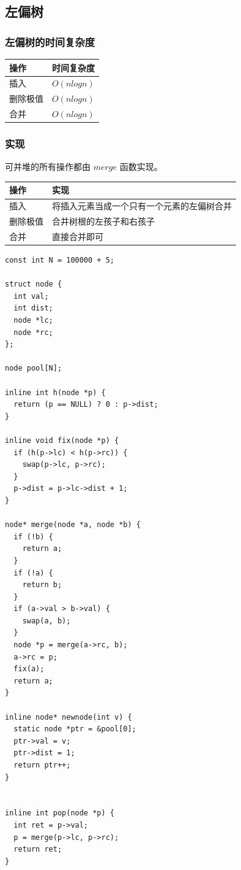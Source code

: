 \documentclass[11pt]{article}
\begin{document}
\subsection{左偏树}
\label{sec-4-5}

\subsubsection{左偏树的时间复杂度}
\label{sec-4-5-1}

\begin{center}
\begin{tabular}{ll}
操作 & 时间复杂度\\
\hline
插入 & $O(nlogn)$\\
删除极值 & $O(nlogn)$\\
合并 & $O(nlogn)$\\
\end{tabular}
\end{center}

\subsubsection{实现}
\label{sec-4-5-2}

可并堆的所有操作都由 $merge$ 函数实现。

\begin{center}
\begin{tabular}{ll}
操作 & 实现\\
\hline
插入 & 将插入元素当成一个只有一个元素的左偏树合并\\
删除极值 & 合并树根的左孩子和右孩子\\
合并 & 直接合并即可\\
\end{tabular}
\end{center}

\begin{verbatim}
const int N = 100000 + 5;

struct node {
  int val;
  int dist;
  node *lc;
  node *rc;
};

node pool[N];

inline int h(node *p) {
  return (p == NULL) ? 0 : p->dist;
}

inline void fix(node *p) {
  if (h(p->lc) < h(p->rc)) {
    swap(p->lc, p->rc);
  }
  p->dist = p->lc->dist + 1;
}

node* merge(node *a, node *b) {
  if (!b) {
    return a;
  }
  if (!a) {
    return b;
  }
  if (a->val > b->val) {
    swap(a, b);
  }
  node *p = merge(a->rc, b);
  a->rc = p;
  fix(a);
  return a;
}

inline node* newnode(int v) {
  static node *ptr = &pool[0];
  ptr->val = v;
  ptr->dist = 1;
  return ptr++;
}


inline int pop(node *p) {
  int ret = p->val;
  p = merge(p->lc, p->rc);
  return ret;
}
\end{verbatim}
\end{document}
